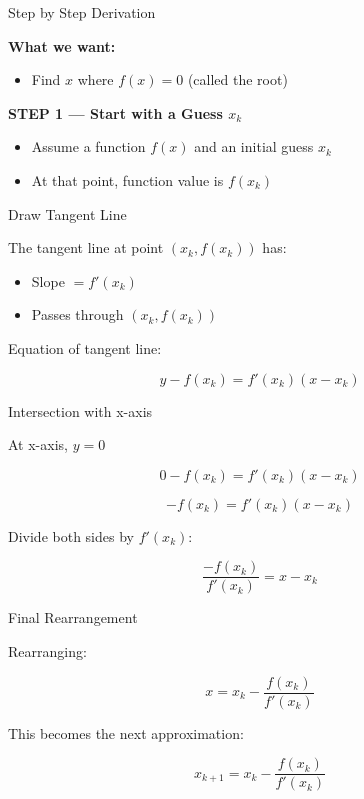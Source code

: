 \documentclass{beamer}
\begin{document}
\begin{frame}{Step by Step Derivation}

\textbf{What we want:}

\begin{itemize}
\item Find $x$ where $f(x) = 0$ (called the root)
\end{itemize}

\vspace{0.5cm}

\textbf{STEP 1 — Start with a Guess $x_k$}

\begin{itemize}
\item Assume a function $f(x)$ and an initial guess $x_k$
\item At that point, function value is $f(x_k)$
\end{itemize}

\end{frame}

\begin{frame}{Draw Tangent Line}

The tangent line at point $(x_k, f(x_k))$ has:

\begin{itemize}
\item Slope $= f'(x_k)$
\item Passes through $(x_k, f(x_k))$
\end{itemize}

\vspace{0.5cm}

Equation of tangent line:

\[
y - f(x_k) = f'(x_k)(x - x_k)
\]

\end{frame}

\begin{frame}{ Intersection with x-axis}

At x-axis, $y = 0$

\[
0 - f(x_k) = f'(x_k)(x - x_k)
\]

\[
-f(x_k) = f'(x_k)(x - x_k)
\]

Divide both sides by $f'(x_k)$:

\[
\frac{-f(x_k)}{f'(x_k)} = x - x_k
\]

\end{frame}

\begin{frame}{Final Rearrangement}

Rearranging:

\[
x = x_k - \frac{f(x_k)}{f'(x_k)}
\]

\vspace{0.5cm}

This becomes the next approximation:

\[
\boxed{x_{k+1} = x_k - \frac{f(x_k)}{f'(x_k)}}
\]

\end{frame}
\end{document}
